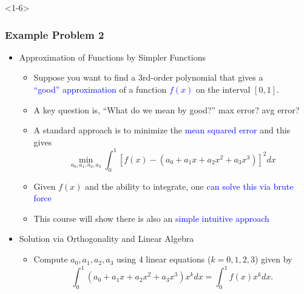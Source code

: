 \documentclass[10pt,english,aspectratio=169]{beamer}
\begin{document}
\begin{frame}<1-6> \frametitle{Example Problem 2}

\begin{itemize}
\item<1-> Approximation of Functions by Simpler Functions \vspace{1mm}

\begin{itemize}
  \setlength\itemsep{3mm}
  \item<1-> Suppose you want to find a 3rd-order polynomial that gives a \\ \textcolor{blue}{``good'' approximation} of a function \textcolor{blue}{$f(x)$} on the interval $[0,1]$.
  
  \item<2-> A key question is, ``What do we mean by good?'' max error? avg error?
  
  \item<3-> A standard approach is to minimize the \textcolor{blue}{mean squared error} and this gives
  \[ \min_{a_0,a_1,a_2,a_3} \int_0^1 \left[ f(x) - (a_0+a_1 x+ a_2 x^2+a_3 x^3) \right]^2 dx \]
  
  \item<4-> Given $f(x)$ and the ability to integrate, one \textcolor{blue}{can solve this via brute force}
  
  \item<5-> This course will show there is also an \textcolor{blue}{simple intuitive approach}

\vspace{3mm}

\end{itemize}

\item <6-> Solution via Orthogonality and Linear Algebra \vspace{1mm}

\begin{itemize}
  \setlength\itemsep{3mm}
  \item<6-> Compute $a_0,a_1,a_2,a_3$ using 4 linear equations ($k=0,1,2,3$) given by
  \[ \int_0^1 (a_0+a_1 x+ a_2 x^2+a_3 x^3) x^k dx = \int_0^1 f(x)x^k dx. \]
\end{itemize}
  
\end{itemize}


\end{frame}
\end{document}
